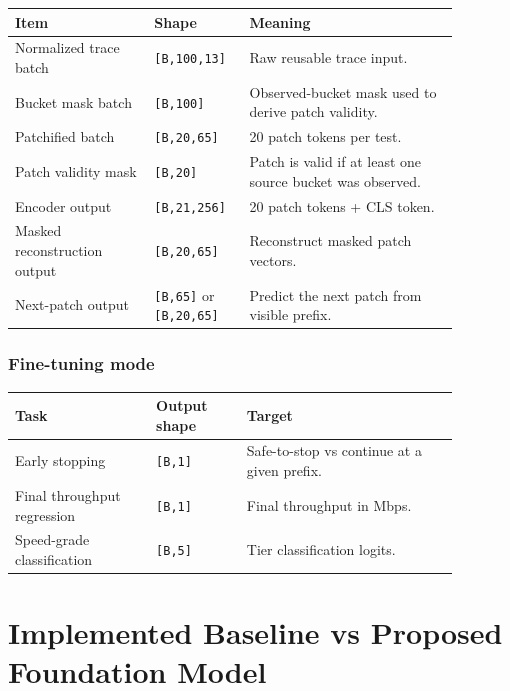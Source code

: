 \documentclass[11pt]{article}
\newcommand{\toprule}{\hline}
\newcommand{\midrule}{\hline}
\newcommand{\bottomrule}{\hline}
\begin{document}
\begin{center}
\begin{tabular}{p{0.28\linewidth} p{0.18\linewidth} p{0.42\linewidth}}
\toprule
\textbf{Item} & \textbf{Shape} & \textbf{Meaning} \\
\midrule
Normalized trace batch & \texttt{[B,100,13]} & Raw reusable trace input. \\
Bucket mask batch & \texttt{[B,100]} & Observed-bucket mask used to derive patch validity. \\
Patchified batch & \texttt{[B,20,65]} & 20 patch tokens per test. \\
Patch validity mask & \texttt{[B,20]} & Patch is valid if at least one source bucket was observed. \\
Encoder output & \texttt{[B,21,256]} & 20 patch tokens + CLS token. \\
Masked reconstruction output & \texttt{[B,20,65]} & Reconstruct masked patch vectors. \\
Next-patch output & \texttt{[B,65]} or \texttt{[B,20,65]} & Predict the next patch from visible prefix. \\
\bottomrule
\end{tabular}
\end{center}

\subsubsection*{Fine-tuning mode}

\begin{center}
\begin{tabular}{p{0.28\linewidth} p{0.18\linewidth} p{0.42\linewidth}}
\toprule
\textbf{Task} & \textbf{Output shape} & \textbf{Target} \\
\midrule
Early stopping & \texttt{[B,1]} & Safe-to-stop vs continue at a given prefix. \\
Final throughput regression & \texttt{[B,1]} & Final throughput in Mbps. \\
Speed-grade classification & \texttt{[B,5]} & Tier classification logits. \\
\bottomrule
\end{tabular}
\end{center}

\section{Implemented Baseline vs Proposed Foundation Model}
\end{document}
